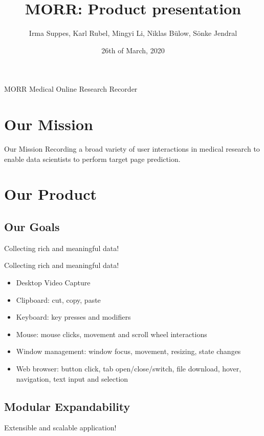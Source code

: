 \documentclass[aspectratio=169]{beamer}
\title{MORR: Product presentation}
\author{Irma Suppes, Karl Rubel, Mingyi Li, Niklas Bülow, Sönke Jendral}
\date{26th of March, 2020}
\institute{KIT / Teco}
\begin{document}
  \maketitle
  
  \begin{frame}{MORR}
      Medical Online Research Recorder
  \end{frame}

  \section{Our Mission}

  \begin{frame}{Our Mission}
  	Recording a broad variety of user interactions in medical research to enable data scientists to perform target page prediction.
  \end{frame}

  \section{Our Product}
  
   \subsection{Our Goals}
   
   \begin{frame}
       Collecting rich and meaningful data!
   \end{frame}
   
   \begin{frame}{Collecting rich and meaningful data!}
        \begin{itemize}
            \item Desktop Video Capture
            \item Clipboard: cut, copy, paste
            \item Keyboard: key presses and modifiers
            \item Mouse: mouse clicks, movement and scroll wheel interactions
            \item Window management: window focus, movement, resizing, state changes
            \item Web browser: button click, tab open/close/switch, file download, hover, navigation, text input and selection
        \end{itemize}
   \end{frame}
   
   \subsection{Modular Expandability}
   \begin{frame}
       Extensible and scalable application!
   \end{frame}
   
\end{document}
